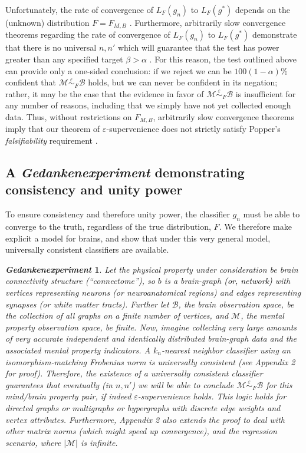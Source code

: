 \documentclass{article}
\newcommand{\mB}{\mathcal{B}}
\newcommand{\mM}{\mathcal{M}}
\providecommand{\mc}[1]{\mathcal{#1}}
\newcommand{\MeB}{\mM \overset{\varepsilon}{{\sim}}_{F} \mB}
\providecommand{\tr}[1]{\textcolor{black}{#1}}
\newtheorem{thex}{\emph{Gedankenexperiment}}
\begin{document}
Unfortunately, the rate of convergence of $L_{F}(g_n)$ to $L_{F}(g^*)$ depends on the (unknown) distribution $F=F_{M,B}$ \cite{DGL96}. Furthermore, arbitrarily slow convergence theorems regarding the rate of convergence of $L_{F}(g_n)$ to $L_{F}(g^*)$ demonstrate that there is no universal $n,n'$ which will guarantee that the test has power greater than any specified target $\beta > \alpha$ \cite{Devroye83}. For this reason, the test outlined above can provide only a one-sided conclusion: if we reject we can be $100(1-\alpha)$\% confident that $\MeB$ holds, but we can never be confident in its negation; rather, it may be the case that the evidence in favor of $\MeB$ is insufficient for any number of reasons, including that we simply have not yet collected enough data. Thus, without restrictions on $F_{M,B}$, arbitrarily slow convergence theorems imply that our theorem of $\varepsilon$-supervenience does not \tr{strictly} satisfy Popper's {\it falsifiability} requirement \cite{Popper}.


\subsection*{A \emph{Gedankenexperiment} demonstrating consistency and unity power} %
\label{sub:uc}

To ensure consistency and therefore unity power, the classifier $g_n$ must be able to converge to the truth, regardless of the true distribution, $F$.  We therefore make explicit a model for brains, and show that under this very general model, universally consistent classifiers are available.

\begin{thex}
Let the physical property under consideration be brain connectivity structure (``connectome''), so $b$ is a brain-graph \tr{(or, network)} with vertices representing neurons (or neuroanatomical regions) and edges representing synapses (or white matter tracts). Further let $\mB$, the brain observation space, be the collection of all graphs on a finite number of vertices, and $\mc{M}$, the mental property observation space, be finite. Now, imagine collecting very large amounts of very accurate independent and identically distributed brain-graph data and the associated mental property indicators. A $k_n$-nearest neighbor classifier using an isomorphism-matching Frobenius norm is universally consistent (see Appendix 2 for proof). Therefore, %
the existence of a universally consistent classifier guarantees that eventually (in $n,n'$) we will be able to conclude $\MeB$ for this mind/brain property pair, if indeed $\varepsilon$-supervenience holds. This logic holds for directed graphs or multigraphs or hypergraphs with discrete edge weights and vertex attributes. Furthermore, Appendix 2 also extends the proof to deal with other matrix norms (which might speed up convergence), and the regression scenario, where $|\mM|$ is infinite.  
\end{thex}
\end{document}
